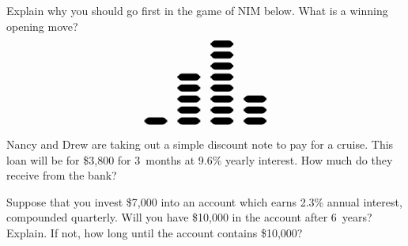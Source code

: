 \documentclass[12pt,letterpaper]{exam}
\begin{document}
\begin{questions}
\newpage
\question[10] Explain why you should go first in the game of NIM below. What is a winning opening move?
	\[
	\begin{tikzpicture}[scale=0.7]
	\draw[rounded corners,fill=black] (0,0) rectangle (1,0.3);
	\draw[rounded corners,fill=black] (1.5,0) rectangle (2.5,0.3);
	\draw[rounded corners,fill=black] (1.5,0.5) rectangle (2.5,0.8);
	\draw[rounded corners,fill=black] (1.5,1) rectangle (2.5,1.3);
	\draw[rounded corners,fill=black] (1.5,1.5) rectangle (2.5,1.8);
	\draw[rounded corners,fill=black] (1.5,2) rectangle (2.5,2.3);
	\draw[rounded corners,fill=black] (3,0) rectangle (4,0.3);
	\draw[rounded corners,fill=black] (3,0.5) rectangle (4,0.8);
	\draw[rounded corners,fill=black] (3,1) rectangle (4,1.3);	
	\draw[rounded corners,fill=black] (3,1.5) rectangle (4,1.8);	
	\draw[rounded corners,fill=black] (3,2) rectangle (4,2.3);	
	\draw[rounded corners,fill=black] (3,2.5) rectangle (4,2.8);	
	\draw[rounded corners,fill=black] (3,3) rectangle (4,3.3);	
	\draw[rounded corners,fill=black] (3,3.5) rectangle (4,3.8);	
	\draw[rounded corners,fill=black] (4.5,0) rectangle (5.5,0.3);
	\draw[rounded corners,fill=black] (4.5,0.5) rectangle (5.5,0.8);
	\draw[rounded corners,fill=black] (4.5,1) rectangle (5.5,1.3);	
	\end{tikzpicture}
	\]



\newpage
\question[10] Nancy and Drew are taking out a simple discount note to pay for a cruise. This loan will be for \$3,800 for 3~months at 9.6\% yearly interest. How much do they receive from the bank? 



\newpage
\question[10] Suppose that you invest \$7,000 into an account which earns 2.3\% annual interest, compounded quarterly. Will you have \$10,000 in the account after 6~years? Explain. If not, how long until the account contains \$10,000?


\end{questions}
\end{document}
